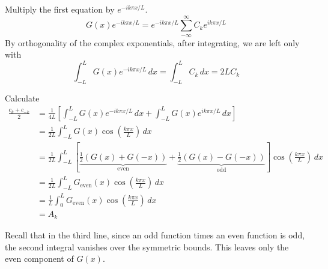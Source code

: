 \documentclass[a4paper]{article}
\begin{document}
Multiply the first equation by \( e^{-ik \pi x / L} \). 
\[
	G \!\left( x \right) e^{-ik \pi x / L} = e^{-ik \pi x / L} \sum_{-\infty}^{\infty} C_{k} e^{ik \pi x / L} 
\]
By orthogonality of the complex exponentials, after integrating, we are left only with 
\[
	\int^{L}_{-L} G \!\left( x \right) e^{-ik \pi x / L} \, dx = \int^{L}_{-L} C_{k} \, dx = 2LC_{k} 
\]


Calculate
\begin{align*}
	\frac{c_{k} + c_{-k}}{2} & = \frac{1}{4L} \!\left[ \int^{L}_{-L} G \!\left( x \right) e^{-ik \pi x / L} \, dx + \int^{L}_{-L} G \!\left( x \right) e^{i k \pi x / L} \, dx \right] \\
	 & = \frac{1}{2L} \int^{L}_{-L} G \!\left( x \right) \cos\!\left(\frac{k \pi x }{L}\right) \, dx \\ 
	 & = \frac{1}{2L} \int^{L}_{-L} \!\left[ \underbrace{\frac{1}{2} \!\left( G \!\left( x \right) + G \!\left( -x \right) \right)}_{\text{even}} + \underbrace{\frac{1}{2} \!\left( G \!\left( x \right) - G \!\left( -x \right) \right)}_{\text{odd}} \right] \cos\!\left(\frac{k \pi x }{L}\right) \, dx \\ 
	 & = \frac{1}{2L} \int^{L}_{-L} G_{\text{even}}\!\left( x \right) \cos\!\left(\frac{k \pi x }{L}\right)  \, dx \\
	 & = \frac{1}{L} \int^{L}_{0} G_{\text{even}}\!\left( x \right) \cos\!\left(\frac{k \pi x }{L}\right) \, dx \\
	 & = A_{k}
\end{align*}

Recall that in the third line, since an odd function times an even function is odd, the second integral vanishes over the symmetric bounds. This leaves only the even component of \( G \!\left( x \right) \).

\vspace{12pt}

\end{document}
